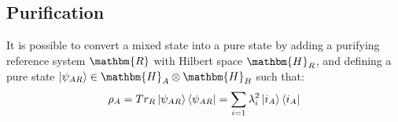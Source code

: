 \documentclass{article}
\begin{document}
\subsection{Purification}
It is possible to convert a mixed state into a pure state by adding a purifying reference system $\mathbm{R}$ with Hilbert space $\mathbm{H}_R$, and defining a pure state $\ket{\psi_{AR}} \in \mathbm{H}_A \otimes \mathbm{H}_B$ such that:
$$
\rho_A = Tr_R \ket{\psi_{AR}}\bra{\psi_{AR}} = \sum_{i=1}\lambda_i^2 \ket{i_A}\bra{i_A}
$$
\end{document}
